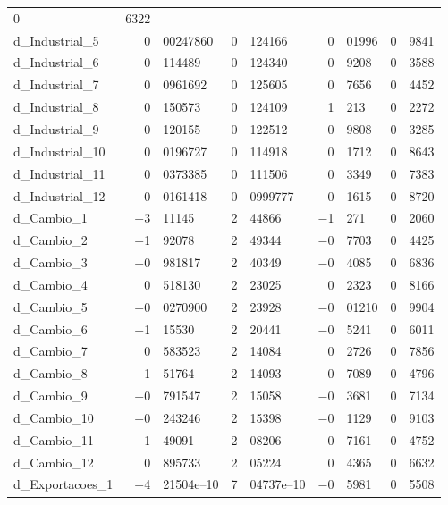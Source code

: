 \documentclass[11pt]{article}
\begin{document}
\begin{center}
\begin{tabular}{lr@{,}lr@{,}lr@{,}lr@{,}l}
        0&6322 \\
d\_Industrial\_5 &
  0&00247860 &
    0&124166 &
      0&01996 &
        0&9841 \\
d\_Industrial\_6 &
  0&114489 &
    0&124340 &
      0&9208 &
        0&3588 \\
d\_Industrial\_7 &
  0&0961692 &
    0&125605 &
      0&7656 &
        0&4452 \\
d\_Industrial\_8 &
  0&150573 &
    0&124109 &
      1&213 &
        0&2272 \\
d\_Industrial\_9 &
  0&120155 &
    0&122512 &
      0&9808 &
        0&3285 \\
d\_Industrial\_10 &
  0&0196727 &
    0&114918 &
      0&1712 &
        0&8643 \\
d\_Industrial\_11 &
  0&0373385 &
    0&111506 &
      0&3349 &
        0&7383 \\
d\_Industrial\_12 &
  $-$0&0161418 &
    0&0999777 &
      $-$0&1615 &
        0&8720 \\
d\_Cambio\_1 &
  $-$3&11145 &
    2&44866 &
      $-$1&271 &
        0&2060 \\
d\_Cambio\_2 &
  $-$1&92078 &
    2&49344 &
      $-$0&7703 &
        0&4425 \\
d\_Cambio\_3 &
  $-$0&981817 &
    2&40349 &
      $-$0&4085 &
        0&6836 \\
d\_Cambio\_4 &
  0&518130 &
    2&23025 &
      0&2323 &
        0&8166 \\
d\_Cambio\_5 &
  $-$0&0270900 &
    2&23928 &
      $-$0&01210 &
        0&9904 \\
d\_Cambio\_6 &
  $-$1&15530 &
    2&20441 &
      $-$0&5241 &
        0&6011 \\
d\_Cambio\_7 &
  0&583523 &
    2&14084 &
      0&2726 &
        0&7856 \\
d\_Cambio\_8 &
  $-$1&51764 &
    2&14093 &
      $-$0&7089 &
        0&4796 \\
d\_Cambio\_9 &
  $-$0&791547 &
    2&15058 &
      $-$0&3681 &
        0&7134 \\
d\_Cambio\_10 &
  $-$0&243246 &
    2&15398 &
      $-$0&1129 &
        0&9103 \\
d\_Cambio\_11 &
  $-$1&49091 &
    2&08206 &
      $-$0&7161 &
        0&4752 \\
d\_Cambio\_12 &
  0&895733 &
    2&05224 &
      0&4365 &
        0&6632 \\
d\_Exportacoes\_1 &
  $-$4&21504\textrm{e--10} &
    7&04737\textrm{e--10} &
      $-$0&5981 &
        0&5508 \\

\end{tabular}
\end{center}
\end{document}

